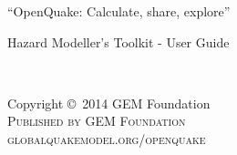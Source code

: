 \documentclass[11pt,fleqn]{book} %
\begin{document}
\lstset{language=Python} %
%


\begingroup
\thispagestyle{empty}
\par\normalfont\fontsize{15}{15}\sffamily\selectfont
“OpenQuake: Calculate, share, explore”
\centering
\vspace*{9cm}
\par\normalfont\fontsize{35}{35}\sffamily\selectfont
Hazard Modeller's Toolkit - User Guide\par %
\endgroup


\newpage
~\vfill
\thispagestyle{empty}

\noindent Copyright \copyright\ 2014 GEM Foundation\\ %

\noindent \textsc{Published by GEM Foundation}\\ %

\noindent \textsc{globalquakemodel.org/openquake}\\ %
\end{document}
